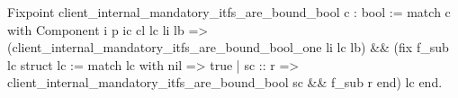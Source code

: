 Fixpoint client_internal_mandatory_itfs_are_bound_bool c : bool := 
 match c with
   Component i p ic cl lc li lb => 
    (client_internal_mandatory_itfs_are_bound_bool_one li lc lb) &&
    (fix f_sub lc {struct lc} :=
      match lc with
        nil     => true
      | sc :: r => 
         client_internal_mandatory_itfs_are_bound_bool sc && f_sub r
     end) lc
end.